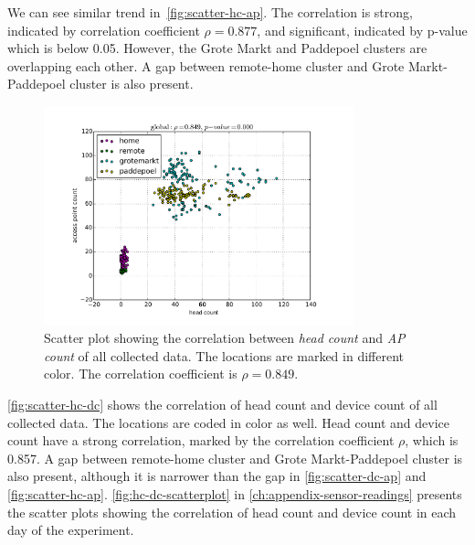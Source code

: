 	We can see similar trend in~\autoref{fig:scatter-hc-ap}. The correlation is strong, indicated by correlation coefficient $\rho = 0.877$, and significant, indicated by p-value which is below 0.05. However, the Grote Markt and Paddepoel clusters are overlapping each other. A gap between remote-home cluster and Grote Markt-Paddepoel cluster is also present.

	\begin{figure}[H]
		\centering
		\includegraphics[width=0.8\textwidth]{./img/result/global-gt-vs-ap}
		\caption[Scatter plot of head and \ac{AP} count.]
		{Scatter plot showing the correlation between \textit{head count} and \textit{\ac{AP} count} of all collected data. The locations are marked in different color. The correlation coefficient is $\rho=0.849$.}
		\label{fig:scatter-hc-ap}
	\end{figure}

	\autoref{fig:scatter-hc-dc} shows the correlation of head count and device count of all collected data. The locations are coded in color as well. Head count and device count have a strong correlation, marked by the correlation coefficient $\rho$, which is 0.857. A gap between remote-home cluster and Grote Markt-Paddepoel cluster is also present, although it is narrower than the gap in \autoref{fig:scatter-dc-ap} and \autoref{fig:scatter-hc-ap}. \autoref{fig:hc-dc-scatterplot} in \autoref{ch:appendix-sensor-readings} presents the scatter plots showing the correlation of head count and device count in each day of the experiment.

